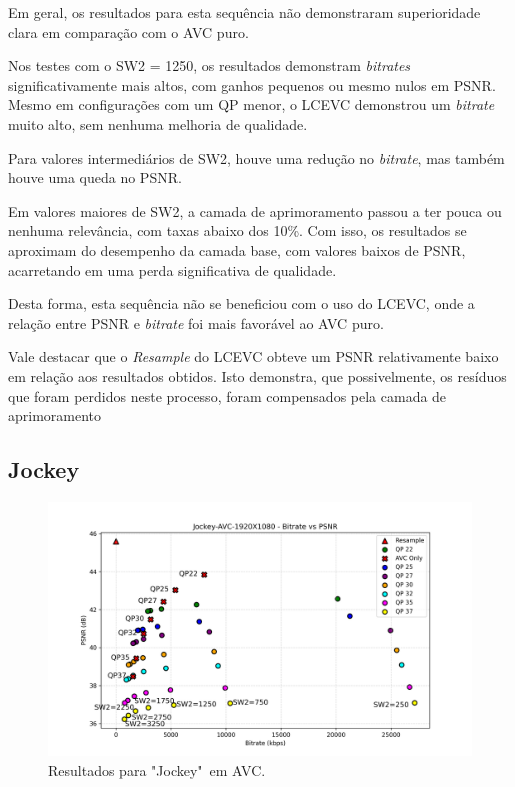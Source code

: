 Em geral, os resultados para esta sequência não demonstraram superioridade clara
em comparação com o \acrshort{AVC} puro.

Nos testes com o SW2 = 1250, os resultados demonstram \textit{bitrates} 
significativamente mais altos, com ganhos pequenos ou mesmo nulos em \acrshort{PSNR}.
Mesmo em configurações com um QP menor, o \acrshort{LCEVC} demonstrou um \textit{bitrate}
muito alto, sem nenhuma melhoria de qualidade.

Para valores intermediários de SW2, houve uma redução no \textit{bitrate}, mas
também houve uma queda no \acrshort{PSNR}.

Em valores maiores de SW2, a camada de aprimoramento passou a ter pouca ou nenhuma
relevância, com taxas abaixo dos 10\%. Com isso, os resultados se aproximam do
desempenho da camada base, com valores baixos de \acrshort{PSNR}, acarretando
em uma perda significativa de qualidade.

Desta forma, esta sequência não se beneficiou com o uso do \acrshort{LCEVC}, onde
a relação entre \acrshort{PSNR} e \textit{bitrate} foi mais favorável ao \acrshort{AVC}
puro.

Vale destacar que o \textit{Resample} do \acrshort{LCEVC} obteve um \acrshort{PSNR}
relativamente baixo em relação aos resultados obtidos. Isto demonstra, que possivelmente,
os resíduos que foram perdidos neste processo, foram compensados pela camada de 
aprimoramento

\newpage
\subsection{Jockey}

\begin{figure}[h!]
    \centering
    \includegraphics[width=1.0\textwidth]{img/Jockey-AVC.png}
    \caption{Resultados para "Jockey"\ em \acrshort{AVC}. \cite{uvg_dataset}}
    \label{fig:Jockey}
\end{figure}

